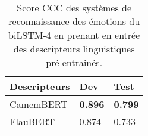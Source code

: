 \begin{table}[h]
  \centering
  \begin{tabular}{|l|l|l|}
  \hline
  Descripteurs   &Dev   &Test  \\
  \hline
  CamemBERT      &\textbf{0.896} &\textbf{0.799} \\
  FlauBERT       &0.874 &0.733 \\
  \hline
\end{tabular}
\caption{Score CCC des systèmes de reconnaissance des émotions du biLSTM-4 en prenant en entrée des descripteurs linguistiques pré-entrainés.}
\label{tab:res_camembert}
\end{table}
